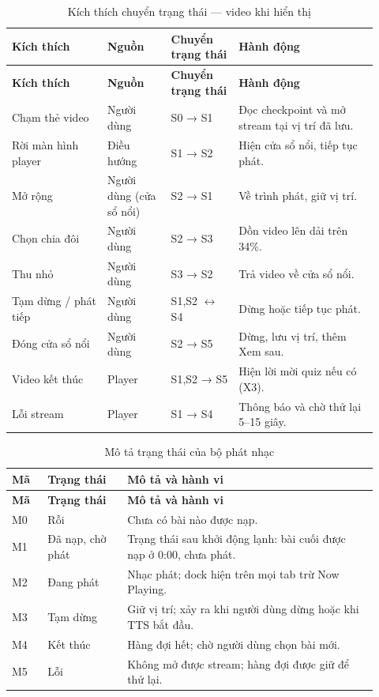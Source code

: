 \begin{longtable}{>{\RaggedRight\arraybackslash}p{0.24\linewidth}>{\RaggedRight\arraybackslash}p{0.16\linewidth}>{\RaggedRight\arraybackslash}p{0.17\linewidth}>{\RaggedRight\arraybackslash}p{0.35\linewidth}}
\caption{Kích thích chuyển trạng thái — video khi hiển thị}
\label{tab:state-video-stim}\\
\toprule
\textbf{Kích thích} & \textbf{Nguồn} & \textbf{Chuyển trạng thái} & \textbf{Hành động} \\
\midrule
\endfirsthead
\toprule
\textbf{Kích thích} & \textbf{Nguồn} & \textbf{Chuyển trạng thái} & \textbf{Hành động} \\
\midrule
\endhead
\bottomrule
\endfoot
Chạm thẻ video & Người dùng & S0 → S1 & Đọc checkpoint và mở stream tại vị trí đã lưu. \\
Rời màn hình player & Điều hướng & S1 → S2 & Hiện cửa sổ nổi, tiếp tục phát. \\
Mở rộng & Người dùng (cửa sổ nổi) & S2 → S1 & Về trình phát, giữ vị trí. \\
Chọn chia đôi & Người dùng & S2 → S3 & Dồn video lên dải trên 34\%. \\
Thu nhỏ & Người dùng & S3 → S2 & Trả video về cửa sổ nổi. \\
Tạm dừng / phát tiếp & Người dùng & S1,S2 $\leftrightarrow$ S4 & Dừng hoặc tiếp tục phát. \\
Đóng cửa sổ nổi & Người dùng & S2 → S5 & Dừng, lưu vị trí, thêm Xem sau. \\
Video kết thúc & Player & S1,S2 → S5 & Hiện lời mời quiz nếu có (X3). \\
Lỗi stream & Player & S1 → S4 & Thông báo và chờ thử lại 5--15 giây. \\
\end{longtable}
\endgroup

\begingroup\small\renewcommand{\arraystretch}{1.12}\setlength{\tabcolsep}{3pt}
\begin{longtable}{>{\RaggedRight\arraybackslash}p{0.09\linewidth}>{\RaggedRight\arraybackslash}p{0.20\linewidth}>{\RaggedRight\arraybackslash}p{0.63\linewidth}}
\caption{Mô tả trạng thái của bộ phát nhạc}
\label{tab:state-music}\\
\toprule
\textbf{Mã} & \textbf{Trạng thái} & \textbf{Mô tả và hành vi} \\
\midrule
\endfirsthead
\toprule
\textbf{Mã} & \textbf{Trạng thái} & \textbf{Mô tả và hành vi} \\
\midrule
\endhead
\bottomrule
\endfoot
M0 & Rỗi & Chưa có bài nào được nạp. \\
M1 & Đã nạp, chờ phát & Trạng thái sau khởi động lạnh: bài cuối được nạp ở 0:00, chưa phát. \\
M2 & Đang phát & Nhạc phát; dock hiện trên mọi tab trừ Now Playing. \\
M3 & Tạm dừng & Giữ vị trí; xảy ra khi người dùng dừng hoặc khi TTS bắt đầu. \\
M4 & Kết thúc & Hàng đợi hết; chờ người dùng chọn bài mới. \\
M5 & Lỗi & Không mở được stream; hàng đợi được giữ để thử lại. \\
\end{longtable}

